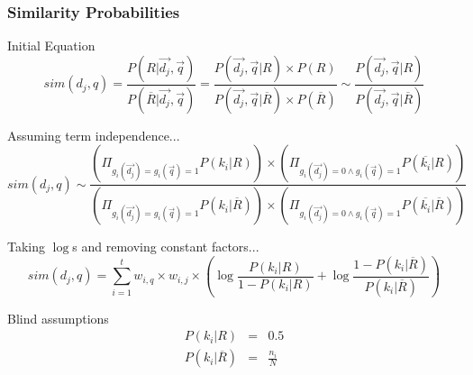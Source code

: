 \documentclass[svgnames]{beamer}
\begin{document}
\begin{frame}[allowframebreaks]
  \frametitle{Similarity Probabilities}

  \begin{block}{Initial Equation}
    \small
    \begin{displaymath}
        sim(d_j,q) = \frac{P(R|\vec{d_j},\vec{q})}{P(\overline{R}|\vec{d_j},\vec{q})}
        = \frac{P(\vec{d_j},\vec{q}|R) \times P(R)}{P(\vec{d_j},\vec{q}|\overline{R}) \times
          P(\overline{R})}
        \sim \frac{P(\vec{d_j},\vec{q}|R)}{P(\vec{d_j},\vec{q}|\overline{R})}
     \end{displaymath}
  \end{block}

  \begin{block}{Assuming term independence...}
    \Small
    \begin{displaymath}
      sim(d_j,q) \sim \frac{
        (\Pi_{g_i(\vec{d_j})=g_i(\vec{q})=1}P(k_i|R))\times(\Pi_{g_i(\vec{d_j})=0 \wedge g_i(\vec{q})=1}P(\overline{k_i}|R))
      }{
        (\Pi_{g_i(\vec{d_j})=g_i(\vec{q})=1}P(k_i|\overline{R}))\times(\Pi_{g_i(\vec{d_j})=0 \wedge g_i(\vec{q})=1}P(\overline{k_i}|\overline{R}))}
    \end{displaymath}
  \end{block}

  \begin{block}{Taking $\log$s and removing constant factors...}
    \small
    \begin{displaymath}      
      sim(d_j,q) = \sum_{i=1}^t w_{i,q} \times w_{i,j} \times
      \left(
        \log\frac{P(k_i|R)}{1-P(k_i|R)} + \log\frac{1-P(k_i|\overline{R})}{P(k_i|\overline{R})}
      \right)
    \end{displaymath}
  \end{block}

  \begin{block}{Blind assumptions}
    \begin{displaymath}
      \begin{array}{rcl}
        P(k_i|R) &=& 0.5\\
        P(k_i|\overline{R}) &=& \frac{n_i}{N}\\
      \end{array}
    \end{displaymath}
  \end{block}


\end{frame}
\end{document}
